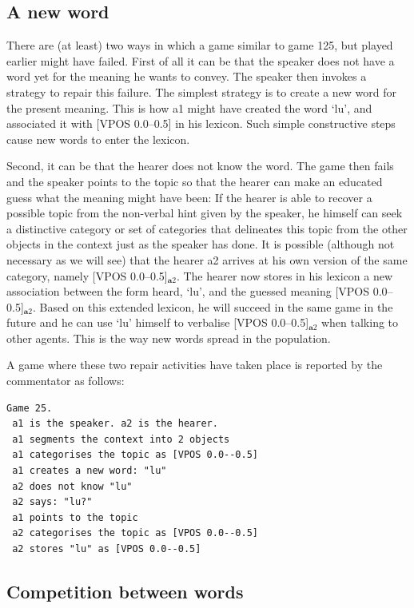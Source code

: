 \subsection{A new word}

There are (at least) two ways in which a game similar to game 125, 
but played earlier might have failed. First of all it can be that
the speaker does not have a word yet for the meaning he wants
to convey. The speaker then invokes a strategy 
to repair this failure. The simplest strategy is to 
create a new word for the present meaning. This is how 
{\bfshape a1} might have created the word `lu', and associated it 
with [VPOS 0.0--0.5] in his lexicon. Such simple constructive steps cause
new words to enter the lexicon. 

Second, it can be that the hearer does not know the word. The 
game then fails and the speaker points to 
the topic so that the hearer can make 
an educated guess what the meaning might have been:
If the hearer is able to recover a possible topic
from the non-verbal hint given by the speaker, 
he himself can seek a distinctive category or set of categories 
that delineates this topic from the other objects in 
the context just as the speaker has done. It is 
possible (although not necessary as we will see)
that the hearer {\bfshape a2} arrives at his 
own version of the same category, namely [VPOS 0.0--0.5]$_{\mathbf  a2}$. The 
hearer now stores in his lexicon a new association between the 
form heard, `lu', and the guessed meaning [VPOS 0.0--0.5]$_{\mathbf  a2}$. 
Based on this extended lexicon, he will succeed in the same game 
in the future and he can use `lu' himself to verbalise [VPOS 0.0--0.5]$_{\mathbf  a2}$
when talking to other agents. This is the way new words
spread in the population.

A game where these two repair activities have taken
place is reported by the commentator as follows: 
\begin{verbatim}
Game 25.
 a1 is the speaker. a2 is the hearer. 
 a1 segments the context into 2 objects
 a1 categorises the topic as [VPOS 0.0--0.5]
 a1 creates a new word: "lu"
 a2 does not know "lu"
 a2 says: "lu?"
 a1 points to the topic 
 a2 categorises the topic as [VPOS 0.0--0.5]
 a2 stores "lu" as [VPOS 0.0--0.5]
\end{verbatim}

\subsection{Competition between words}

